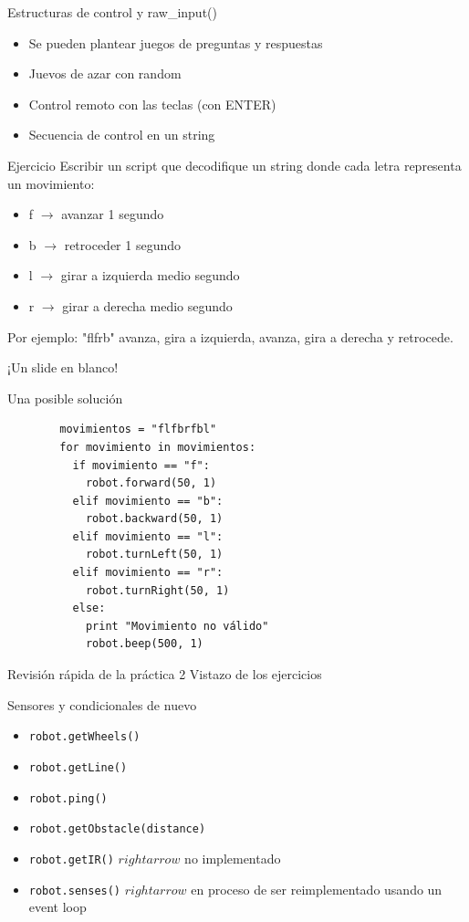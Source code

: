 \documentclass{beamer}[10]
\begin{document}
\begin{frame}{Estructuras de control y raw\_input()}
	\begin{itemize}[<+->]
		\item Se pueden plantear juegos de preguntas y respuestas
		\item Juevos de azar con random
		\item Control remoto con las teclas (con ENTER)
		\item Secuencia de control en un string
	\end{itemize}
\end{frame}
\begin{frame}{Ejercicio}
	Escribir un script que decodifique un string donde cada letra representa un movimiento:
	\begin{itemize}
		\item f $\rightarrow$ avanzar 1 segundo
		\item b $\rightarrow$ retroceder 1 segundo
		\item l $\rightarrow$ girar a izquierda medio segundo
		\item r $\rightarrow$ girar a derecha medio segundo
	\end{itemize}\pause
	Por ejemplo: "flfrb" avanza, gira a izquierda, avanza, gira a derecha y retrocede.
\end{frame}
\begin{frame}
	\begin{center}
		{\huge ¡Un slide en blanco!}
	\end{center}
\end{frame}
\begin{frame}[fragile]{Una posible solución}
	\begin{block}{}
		\begin{lstlisting}
		movimientos = "flfbrfbl"
		for movimiento in movimientos:
		  if movimiento == "f":
		    robot.forward(50, 1)
		  elif movimiento == "b":
		    robot.backward(50, 1)
		  elif movimiento == "l":
		    robot.turnLeft(50, 1)
		  elif movimiento == "r":
		    robot.turnRight(50, 1)
		  else:
		    print "Movimiento no válido"
		    robot.beep(500, 1)
		\end{lstlisting}
	\end{block}
\end{frame}
\begin{frame}{Revisión rápida de la práctica 2}
Vistazo de los ejercicios
\end{frame}
\begin{frame}[fragile]{Sensores y condicionales de nuevo}
	\begin{itemize}[<+->]
		\item \verb+robot.getWheels()+
		\item \verb+robot.getLine()+
		\item \verb+robot.ping()+
		\item \verb+robot.getObstacle(distance)+
		\item \verb+robot.getIR()+ $rightarrow$ no implementado
		\item \verb+robot.senses()+ $rightarrow$ en proceso de ser reimplementado usando un event loop
	\end{itemize}
\end{frame}
\end{document}
